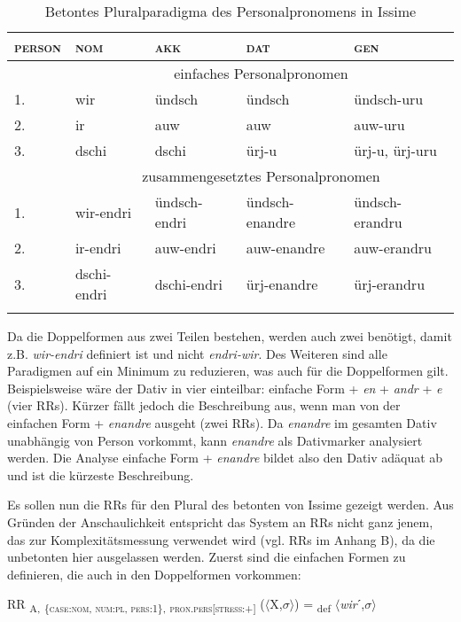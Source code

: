\begin{table}
\caption{Betontes Pluralparadigma des Personalpronomens in Issime \citep[206--312]{Zürrer1999}}\label{table5.19}
\begin{tabular}{lllll}
\lsptoprule
{\textsc{person}} & {\textsc{nom}} & {\textsc{akk}} & {\textsc{dat}} & {\textsc{gen}}\\
\midrule
& \multicolumn{4}{c}{einfaches Personalpronomen}\\\midrule
1. & wir & ündsch & ündsch & ündsch-uru\\
2. & ir & auw & auw & auw-uru\\
3. & dschi & dschi & ürj-u & ürj-u, ürj-uru\\
\midrule
& \multicolumn{4}{c}{zusammengesetztes Personalpronomen}\\\midrule
1. & wir-endri & ündsch-endri & ündsch-enandre & ündsch-erandru\\
2. & ir-endri & auw-endri & auw-enandre & auw-erandru\\
3. & dschi-endri & dschi-endri & ürj-enandre & ürj-erandru\\
\lspbottomrule
\end{tabular}
\end{table}

Da die Doppelformen aus zwei Teilen bestehen, werden auch zwei  benötigt, damit z.B. \textit{wir-endri} definiert ist und nicht \textit{endri-wir}. Des Weiteren sind alle Paradigmen auf ein Minimum zu reduzieren, was auch für die Doppelformen gilt. Beispielsweise wäre der Dativ in vier  einteilbar: einfache Form + \textit{en} + \textit{andr} + \textit{e} (vier RRs). Kürzer fällt jedoch die Beschreibung aus, wenn man von der einfachen Form + \textit{enandre} ausgeht (zwei RRs). Da \textit{enandre} im gesamten Dativ unabhängig von Person vorkommt, kann \textit{enandre} als Dativmarker analysiert werden. Die Analyse einfache Form + \textit{enandre} bildet also den Dativ adäquat ab und ist die kürzeste Beschreibung.

Es sollen nun die RRs für den Plural des betonten  von Issime gezeigt werden. Aus Gründen der Anschaulichkeit entspricht das System an RRs nicht ganz jenem, das zur Komplexitätsmessung verwendet wird (vgl. RRs im Anhang B), da die unbetonten  hier ausgelassen werden. Zuerst sind die einfachen Formen zu definieren, die auch in den Doppelformen vorkommen:

\ea%
\label{ex:key:98}
 RR \textsubscript{A,} \textsubscript{\{\textsc{case:nom}, \textsc{num:pl}, \textsc{pers:1}\},} \textsubscript{\textsc{pron.pers[stress:+]}} ($\langle$X,$\sigma$$\rangle$) = \textsubscript{def} $\langle$\textit{wir}ˊ,$\sigma$$\rangle$
\z

